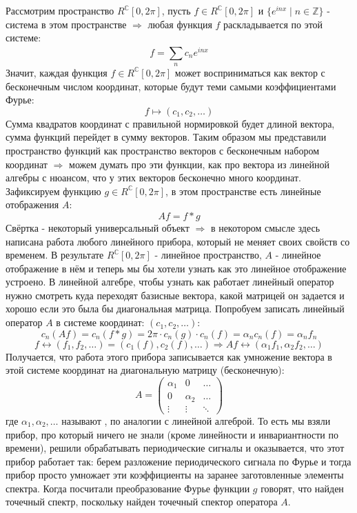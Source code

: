 \documentclass[12pt]{article}
\newcommand{\MC}{\mathbb{C}}
\newcommand{\MZ}{\mathbb{Z}}
\theoremstyle{definition}
\newcommand{\ddsum}[2]{\displaystyle\sum\limits_{#1}^{#2}}
\begin{document}
Рассмотрим пространство $R^{\MC}[0,2\pi]$, пусть $f \in R^{\MC}[0,2\pi]$ и $\{e^{inx} \mid n \in \MZ\}$ - система в этом пространстве $\Rightarrow$ любая функция $f$ раскладывается по этой системе:
$$
	f = \ddsum{n}{}c_ne^{inx}
$$
Значит, каждая функция $f \in R^{\MC}[0,2\pi]$ может восприниматься как вектор с бесконечным числом координат, которые будут теми самыми коэффициентами Фурье: 
$$
	f \mapsto (c_1, c_2, \dotsc)
$$ 
Сумма квадратов координат с правильной нормировкой будет длиной вектора, сумма функций перейдет в сумму векторов. Таким образом мы представили пространство функций как пространство векторов с бесконечным набором координат $\Rightarrow$ можем думать про эти функции, как про вектора из линейной алгебры с нюансом, что у этих векторов бесконечно много координат. Зафиксируем функцию $g \in R^{\MC}[0,2\pi]$, в этом пространстве есть линейные отображения $A$: 
$$
	Af = f*g	
$$
Свёртка - некоторый универсальный объект $\Rightarrow$ в некотором смысле здесь написана работа любого линейного прибора, который не меняет своих свойств со временем. В результате $R^{\MC}[0,2\pi]$ - линейное пространство, $A$ - линейное отображение в нём и теперь мы бы хотели узнать как это линейное отображение устроено. В линейной алгебре, чтобы узнать как работает линейный оператор нужно смотреть куда переходят базисные вектора, какой матрицей он задается и хорошо если это была бы диагональная матрица. Попробуем записать линейный оператор $A$ в системе координат: $(c_1,c_2, \dotsc)$:
$$
	c_n(Af) = c_n(f*g) = 2\pi{\cdot} c_n(g){\cdot}c_n(f) = \alpha_n c_n(f) = \alpha_n f_n 
$$
$$
	f \leftrightarrow (f_1,f_2, \dotsc) = (c_1(f), c_2(f), \dotsc) \Rightarrow Af \leftrightarrow (\alpha_1 f_1, \alpha_2 f_2, \dotsc )
$$
Получается, что работа этого прибора записывается как умножение вектора в этой системе координат на диагональную матрицу (бесконечную):
$$
	A = \begin{pmatrix}
		\alpha_1 & 0 & \dotsc \\
		0 & \alpha_2 & \dotsc \\
		\vdots & \vdots & \ddots
	\end{pmatrix}
$$
где $\alpha_1, \alpha_2, \dotsc$ называют , по аналогии с линейной алгеброй. То есть мы взяли прибор, про который ничего не знали (кроме линейности и инвариантности по времени), решили обрабатывать периодические сигналы и оказывается, что этот прибор работает так: берем разложение периодического сигнала по Фурье и тогда прибор просто умножает эти коэффициенты на заранее заготовленные элементы спектра. Когда посчитали преобразование Фурье функции $g$ говорят, что найден точечный спектр, поскольку найден точечный спектор оператора $A$.
\end{document}
